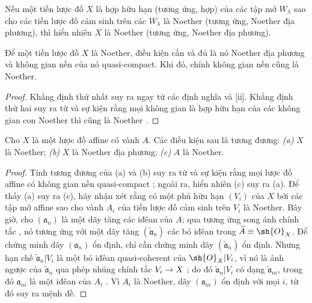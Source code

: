 \documentclass[oneside]{amsart}
\makeatletter
\newcommand{\ega@arrow}[2]{\mathchoice{#1}{#2}{#2}{#2}}
\renewcommand{\to}{\ega@arrow{\longrightarrow}{\rightarrow}}
\let\EGAOriginalLabel\label
\renewcommand{\label}[1]{\phantomsection\EGAOriginalLabel{#1}}
\makeatother
\begin{document}
Nếu một tiền lược đồ $X$ là hợp hữu hạn (tương ứng, hợp) của các tập mở
$W_\lambda$ sao cho các tiền lược đồ cảm sinh trên các $W_\lambda$ là
Noether (tương ứng, Noether địa phương), thì hiển nhiên $X$ là Noether
(tương ứng, Noether địa phương).

\begin{proposition}[6.1.2]
\label{I.6.1.2}
Để một tiền lược đồ $X$ là Noether, điều kiện cần và đủ là nó Noether địa
phương và không gian nền của nó quasi-compact. Khi đó, chính không gian nền
cũng là Noether.
\end{proposition}

\begin{proof}
Khẳng định thứ nhất suy ra ngay từ các định nghĩa và [ii].
Khẳng định thứ hai suy ra từ  và sự kiện rằng mọi không gian
là hợp hữu hạn của các không gian con Noether thì cũng là Noether
.
\end{proof}

\begin{proposition}[6.1.3]
\label{I.6.1.3}
Cho $X$ là một lược đồ affine có vành $A$.
Các điều kiện sau là tương đương:
\emph{(a)} $X$ là Noether;
\emph{(b)} $X$ là Noether địa phương;
\emph{(c)} $A$ là Noether.
\end{proposition}

\begin{proof}
Tính tương đương của (a) và (b) suy ra từ  và sự kiện rằng
mọi lược đồ affine có không gian nền quasi-compact ; ngoài
ra, hiển nhiên (c) suy ra (a). Để thấy (a) suy ra (c), hãy nhận xét rằng có
một phủ hữu hạn $(V_i)$ của $X$ bởi các tập mở affine sao cho vành $A_i$ của
tiền lược đồ cảm sinh trên $V_i$ là Noether. Bây giờ, cho
$(\mathfrak{a}_n)$ là một dãy tăng các iđêan của $A$; qua tương ứng song ánh
chính tắc , nó tương ứng với một dãy tăng
$(\widetilde{\mathfrak{a}}_n)$ các bó iđêan trong
$\widetilde{A}\equiv\sh{O}_X$. Để chứng minh dãy $(\mathfrak{a}_n)$ ổn
định, chỉ cần chứng minh dãy $(\widetilde{\mathfrak{a}}_n)$ ổn định. Nhưng
hạn chế $\widetilde{\mathfrak{a}}_n|V_i$ là một bó iđêan quasi-coherent của
$\sh{O}_X|V_i$, vì nó là ảnh ngược của
$\widetilde{\mathfrak{a}}_n$ qua phép nhúng chính tắc $V_i\to X$
; do đó $\widetilde{\mathfrak{a}}_n|V_i$ có dạng
$\widetilde{\mathfrak{a}}_{ni}$, trong đó $\mathfrak{a}_{ni}$ là một iđêan
của $A_i$ . Vì $A_i$ là Noether, dãy
$(\mathfrak{a}_{ni})$ ổn định với mọi $i$, từ đó suy ra mệnh đề.
\end{proof}
\end{document}
